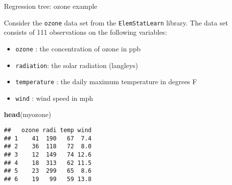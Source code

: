 \documentclass[10pt,ignorenonframetext,]{beamer}
\newenvironment{Shaded}{\begin{snugshade}}{\end{snugshade}}
\newcommand{\KeywordTok}[1]{\textcolor[rgb]{0.13,0.29,0.53}{\textbf{#1}}}
\newcommand{\NormalTok}[1]{#1}
\providecommand{\tightlist}{%
  \setlength{\itemsep}{0pt}\setlength{\parskip}{0pt}}
\begin{document}
\begin{frame}[fragile]

\begin{block}{Regression tree: ozone example}

\vspace{2mm}

Consider the \texttt{ozone} data set from the \texttt{ElemStatLearn}
library. The data set consists of 111 observations on the following
variables:

\begin{itemize}
\tightlist
\item
  \texttt{ozone} : the concentration of ozone in ppb
\item
  \texttt{radiation}: the solar radiation (langleys)
\item
  \texttt{temperature} : the daily maximum temperature in degrees F
\item
  \texttt{wind} : wind speed in mph
\end{itemize}

\vspace{2mm}

\scriptsize

\begin{Shaded}
\begin{Highlighting}[]
\KeywordTok{head}\NormalTok{(myozone)}
\end{Highlighting}
\end{Shaded}

\begin{verbatim}
##   ozone radi temp wind
## 1    41  190   67  7.4
## 2    36  118   72  8.0
## 3    12  149   74 12.6
## 4    18  313   62 11.5
## 5    23  299   65  8.6
## 6    19   99   59 13.8
\end{verbatim}

\end{block}

\end{frame}
\end{document}
